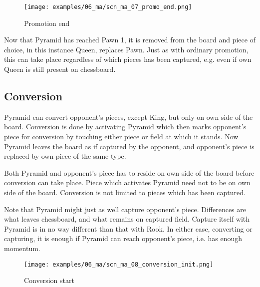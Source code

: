 \clearpage %

\noindent
\begin{figure}[!h]
\texttt{[image: examples/06\_ma/scn\_ma\_07\_promo\_end.png]}
\caption{Promotion end}
\label{fig:scn_ma_07_promo_end}
\end{figure}

Now that Pyramid has reached Pawn 1, it is removed from the board and piece of
choice, in this instance Queen, replaces Pawn. Just as with ordinary promotion,
this can take place regardless of which pieces has been captured, e.g. even if
own Queen is still present on chessboard.

\clearpage %

\subsection*{Conversion}
\label{sec:Mayan Ascendancy/Pyramid/Conversion}

Pyramid can convert opponent's pieces, except King, but only on own side of
the board. Conversion is done by activating Pyramid which then marks opponent's
piece for conversion by touching either piece or field at which it stands. Now
Pyramid leaves the board as if captured by the opponent, and opponent's piece
is replaced by own piece of the same type.

Both Pyramid and opponent's piece has to reside on own side of the board before
conversion can take place. Piece which activates Pyramid need not to be on own
side of the board. Conversion is not limited to pieces which has been captured.

Note that Pyramid might just as well capture opponent's piece. Differences are
what leaves chessboard, and what remains on captured field. Capture itself with
Pyramid is in no way different than that with Rook. In either case, converting
or capturing, it is enough if Pyramid can reach opponent's piece, i.e. has
enough momentum.

\clearpage %

\noindent
\begin{figure}[!h]
\texttt{[image: examples/06\_ma/scn\_ma\_08\_conversion\_init.png]}
\caption{Conversion start}
\label{fig:scn_ma_08_conversion_init}
\end{figure}

